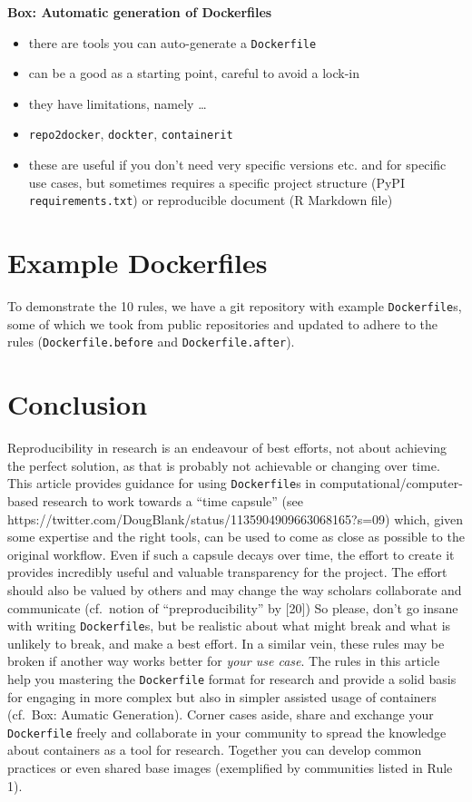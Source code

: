 \documentclass[10pt,letterpaper]{article}
\providecommand{\tightlist}{%
  \setlength{\itemsep}{0pt}\setlength{\parskip}{0pt}}
\begin{document}
\textbf{Box: Automatic generation of Dockerfiles}

\begin{itemize}
\tightlist
\item
  there are tools you can auto-generate a \texttt{Dockerfile}
\item
  can be a good as a starting point, careful to avoid a lock-in
\item
  they have limitations, namely \ldots{}
\item
  \texttt{repo2docker}, \texttt{dockter}, \texttt{containerit}
\item
  these are useful if you don't need very specific versions etc. and for
  specific use cases, but sometimes requires a specific project
  structure (PyPI \texttt{requirements.txt}) or reproducible document (R
  Markdown file)
\end{itemize}

\hypertarget{example-dockerfiles}{%
\section{Example Dockerfiles}\label{example-dockerfiles}}

To demonstrate the 10 rules, we have a git repository with example
\texttt{Dockerfile}s, some of which we took from public repositories and
updated to adhere to the rules (\texttt{Dockerfile.before} and
\texttt{Dockerfile.after}).

\hypertarget{conclusion}{%
\section*{Conclusion}\label{conclusion}}

Reproducibility in research is an endeavour of best efforts, not about
achieving the perfect solution, as that is probably not achievable or
changing over time. This article provides guidance for using
\texttt{Dockerfile}s in computational/computer-based research to work
towards a ``time capsule'' (see
https://twitter.com/DougBlank/status/1135904909663068165?s=09) which,
given some expertise and the right tools, can be used to come as close
as possible to the original workflow. Even if such a capsule decays over
time, the effort to create it provides incredibly useful and valuable
transparency for the project. The effort should also be valued by others
and may change the way scholars collaborate and communicate (cf.~notion
of ``preproducibility'' by {[}20{]}) So please, don't go insane with
writing \texttt{Dockerfile}s, but be realistic about what might break
and what is unlikely to break, and make a best effort. In a similar
vein, these rules may be broken if another way works better for
\emph{your use case}. The rules in this article help you mastering the
\texttt{Dockerfile} format for research and provide a solid basis for
engaging in more complex but also in simpler assisted usage of
containers (cf.~Box: Aumatic Generation). Corner cases aside, share and
exchange your \texttt{Dockerfile} freely and collaborate in your
community to spread the knowledge about containers as a tool for
research. Together you can develop common practices or even shared base
images (exemplified by communities listed in Rule 1).
\end{document}
